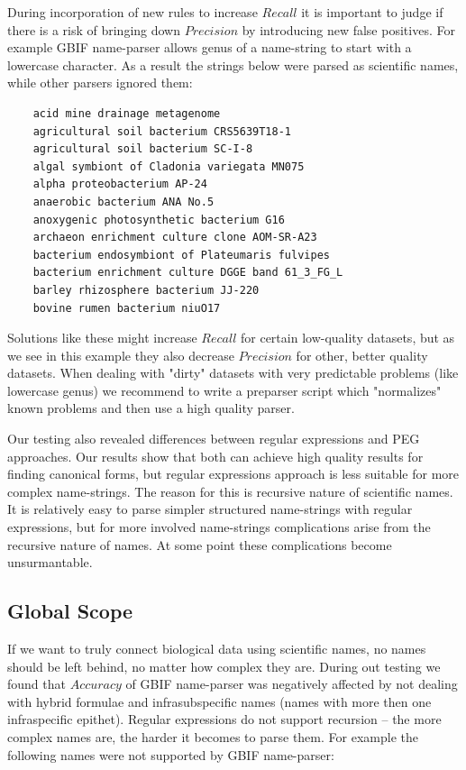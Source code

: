 \documentclass{bmcart}
\begin{document}
During incorporation of new rules to increase $Recall$ it is important to
judge if there is a risk of bringing down $Precision$ by introducing new false
positives.  For example GBIF name-parser allows genus of a name-string to
start with a lowercase character. As a result the strings below were parsed as
scientific names, while other parsers ignored them:


\vspace{0.5cm}
\begin{verbatim}
    acid mine drainage metagenome
    agricultural soil bacterium CRS5639T18-1
    agricultural soil bacterium SC-I-8
    algal symbiont of Cladonia variegata MN075
    alpha proteobacterium AP-24
    anaerobic bacterium ANA No.5
    anoxygenic photosynthetic bacterium G16
    archaeon enrichment culture clone AOM-SR-A23
    bacterium endosymbiont of Plateumaris fulvipes
    bacterium enrichment culture DGGE band 61_3_FG_L
    barley rhizosphere bacterium JJ-220
    bovine rumen bacterium niuO17
\end{verbatim}
\vspace{0.5cm}

Solutions like these might increase $Recall$ for certain low-quality datasets,
but as we see in this example they also decrease $Precision$ for other, better
quality datasets. When dealing with "dirty" datasets with very predictable
problems (like lowercase genus) we recommend to write a preparser script which
"normalizes" known problems and then use a high quality parser.

Our testing also revealed differences between regular expressions and PEG
approaches. Our results show that both can achieve high quality results for
finding canonical forms, but regular expressions approach is less suitable for
more complex name-strings. The reason for this is recursive nature of
scientific names.  It is relatively easy to parse simpler structured
name-strings with regular expressions, but for more involved name-strings
complications arise from the recursive nature of names. At some point these
complications become unsurmantable.

\subsection*{Global Scope}

If we want to truly connect biological data using scientific names, no names
should be left behind, no matter how complex they are. During out testing we
found that $Accuracy$ of GBIF name-parser was negatively affected by not
dealing with hybrid formulae and infrasubspecific names (names with more then
one infraspecific epithet). Regular expressions do not support recursion --
the more complex names are, the harder it becomes to parse them. For example
the following names were not supported by GBIF name-parser:
\end{document}
